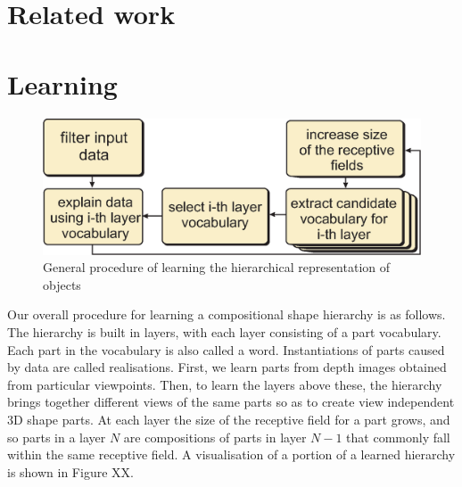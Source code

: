 \documentclass[letterpaper,10pt,conference]{ieeeconf}  %
\begin{document}
\section{Related work}

\section{Learning}

\begin{figure}[t]
 \centering
\includegraphics[width=0.9\columnwidth]{../images/learningGeneral.eps}
\caption{General procedure of learning the hierarchical representation of objects}
 \label{hopProc}
\end{figure}

Our overall procedure for learning a compositional shape hierarchy is as follows. The hierarchy is built in layers, with each layer consisting of a part vocabulary. Each part in the vocabulary is also called a word. Instantiations of parts caused by data are called realisations. First, we learn parts from depth images obtained from particular viewpoints. Then, to learn the layers above these, the hierarchy brings together different views of the same parts so as to create view independent 3D shape parts. At each layer the size of the receptive field for a part grows, and so parts in a layer $N$ are compositions of parts in layer $N-1$ that commonly fall within the same receptive field.  A visualisation of a portion of a learned hierarchy is shown in Figure XX.  
\end{document}
